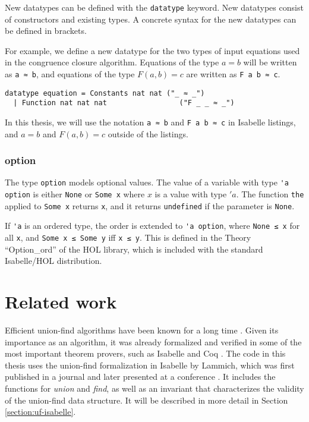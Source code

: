 New datatypes can be defined with the \lstinline|datatype| keyword. New datatypes consist of constructors and existing types. A concrete syntax for the new datatypes can be defined in brackets.

For example, we define a new datatype for the two types of input equations used in the congruence closure algorithm. Equations of the type $a = b$ will be written as \lstinline{a ≈ b}, and equations of the type $F(a, b) = c$ are written as \lstinline{F a b ≈ c}.

\begin{lstlisting}
datatype equation = Constants nat nat ("_ ≈ _")
  | Function nat nat nat                 ("F _ _ ≈ _")
\end{lstlisting}

In this thesis, we will use the notation \lstinline{a ≈ b} and \lstinline{F a b ≈ c} in Isabelle listings, and $a = b$ and $F(a, b) = c$ outside of the listings.

\subsubsection{option}

The type \lstinline{option} models optional values. The value of a variable with type \lstinline{'a option} is either \lstinline|None| or \lstinline|Some x| where $x$ is a value with type $'a$. The function \lstinline|the| applied to \lstinline|Some x| returns \lstinline|x|, and it returns \lstinline|undefined| if the parameter is \lstinline|None|.

If \lstinline{'a} is an ordered type, the order is extended to \lstinline{'a option}, where \lstinline{None ≤ x} for all \lstinline|x|, and \lstinline{Some x ≤ Some y} iff \lstinline{x ≤ y}. This is defined in the Theory ``Option\_ord'' of the HOL library, which is included with the standard Isabelle/HOL distribution.

\section{Related work}

Efficient union-find algorithms have been known for a long time \cite{unionfind-og, Tarjan}. Given its importance as an algorithm, it was already formalized and verified in some of the most important theorem provers, such as Isabelle and Coq \cite{unionfind-persistent}. The code in this thesis uses the union-find formalization in Isabelle by Lammich, which was first published in a journal \cite{unionfind-isabelle} and later presented at a conference \cite{unionfind-isabelle-conference}. It includes the functions for \emph{union} and \emph{find}, as well as an invariant that characterizes the validity of the union-find data structure. It will be described in more detail in Section \ref{section:uf-isabelle}.


